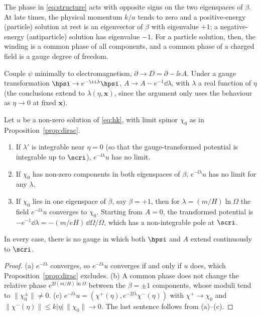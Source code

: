 The phase in \eqref{eq:structure} acts with opposite signs on the two eigenspaces of $\beta$. At late times, the physical momentum $k/a$ tends to zero and a positive-energy (particle) solution at rest is an eigenvector of $\beta$ with eigenvalue $+1$; a negative-energy (antiparticle) solution has eigenvalue $-1$. For a particle solution, then, the winding is a common phase of all components, and a common phase of a charged field is a gauge degree of freedom.

Couple $\psi$ minimally to electromagnetism, $\partial\to D=\partial-\ii eA$. Under a gauge transformation $\hpsi\to e^{-\ii\lambda}\hpsi$, $A\to A-e^{-1}\dd\lambda$, with $\lambda$ a real function of $\eta$ (the conclusions extend to $\lambda(\eta,\mathbf{x})$, since the argument only uses the behaviour as $\eta\to0$ at fixed $\mathbf{x}$).

\begin{proposition}[Gauge]
\label{prop:gauge}
Let $u$ be a non-zero solution of \eqref{eq:hk}, with limit spinor $\chi_{0}$ as in Proposition~\ref{prop:dirac}.
\begin{enumerate}[label=(\alph*)]
\item If $\lambda'$ is integrable near $\eta=0$ (so that the gauge-transformed potential is integrable up to $\scri$), $e^{-\ii\lambda}u$ has no limit.
\item If $\chi_{0}$ has non-zero components in both eigenspaces of $\beta$, $e^{-\ii\lambda}u$ has no limit for any $\lambda$.
\item If $\chi_{0}$ lies in one eigenspace of $\beta$, say $\beta=+1$, then for $\lambda=(m/H)\ln\Omega$ the field $e^{-\ii\lambda}u$ converges to $\chi_{0}$. Starting from $A=0$, the transformed potential is $-e^{-1}\dd\lambda=-(m/eH)\,\dd\Omega/\Omega$, which has a non-integrable pole at $\scri$.
\end{enumerate}
In every case, there is no gauge in which both $\hpsi$ and $A$ extend continuously to $\scri$.
\end{proposition}
\begin{proof}
(a) $e^{-\ii\lambda}$ converges, so $e^{-\ii\lambda}u$ converges if and only if $u$ does, which Proposition~\ref{prop:dirac} excludes. (b) A common phase does not change the relative phase $e^{2\ii(m/H)\ln\Omega}$ between the $\beta=\pm1$ components, whose moduli tend to $\|\chi_{0}^{\pm}\|\neq0$. (c) $e^{-\ii\lambda}u=(\chi^{+}(\eta),e^{-2\ii\lambda}\chi^{-}(\eta))$ with $\chi^{+}\to\chi_{0}$ and $\|\chi^{-}(\eta)\|\le k|\eta|\,\|\chi_{0}\|\to0$. The last sentence follows from (a)--(c).
\end{proof}

